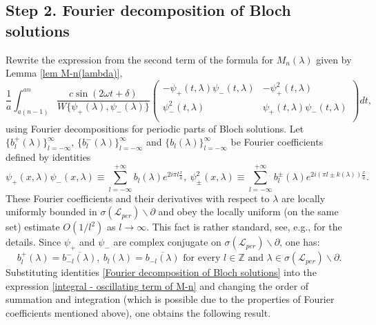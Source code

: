 \documentclass[a4paper,oneside,12pt]{amsart}
\begin{document}
\subsection*{Step 2. Fourier decomposition of Bloch solutions}
Rewrite the expression from the second term of the formula for $M_n(\lambda)$ given by Lemma \ref{lem M-n(lambda)},
\begin{equation}\label{integral - oscillating term of M-n}
    \frac1a\int_{a(n-1)}^{an}
    \frac{c\sin(2\omega t+\delta)}{W\{\psi_+(\lambda),\psi_-(\lambda)\}}
    \left(    \begin{array}{cc}
    -\psi_+(t,\lambda)\psi_-(t,\lambda) & -\psi_+^2(t,\lambda) \\
    \psi_-^2(t,\lambda) & \psi_+(t,\lambda)\psi_-(t,\lambda) \\
    \end{array}    \right)dt,
\end{equation}
using Fourier decompositions for periodic parts of Bloch solutions. Let $\{b_l^+(\lambda)\}_{l=-\infty}^{\infty}$, $\{b_l^-(\lambda)\}_{l=-\infty}^{\infty}$ and $\{b_l(\lambda)\}_{l=-\infty}^{\infty}$ be Fourier coefficients defined by identities
\begin{equation}\label{Fourier decomposition of Bloch solutions}
    \psi_+(x,\lambda)\psi_-(x,\lambda)\equiv\sum\limits_{l=-\infty}^{+\infty}b_l(\lambda)e^{2i\pi l\frac xa},
    \
    \psi_{\pm}^2(x,\lambda)\equiv\sum\limits_{l=-\infty}^{+\infty}b^{\pm}_l(\lambda)e^{2i(\pi l\pm k(\lambda))\frac xa}.
\end{equation}
These Fourier coefficients and their derivatives with respect to $\lambda$ are locally uniformly bounded in $\sigma(\mathcal
L_{per})\backslash\partial$ and obey the locally uniform (on the same set) estimate $O(1/l^2)$ as $l\rightarrow\infty$. This fact is rather standard, see, e.g., \cite{Kurasov-Simonov-2011} for the details. Since $\psi_+$ and $\psi_-$ are complex conjugate on $\sigma(\mathcal
L_{per})\backslash\partial$, one has:
\begin{equation*}
    b^+_l(\lambda)=\overline{b^-_{-l}(\lambda)},
    \
    b_l(\lambda)=\overline{b_{-l}(\lambda)}\text{ for every }l\in\mathbb Z\text{ and }\lambda\in\sigma(\mathcal
    L_{per})\backslash\partial.
\end{equation*}
Substituting identities \eqref{Fourier decomposition of Bloch solutions} into the expression \eqref{integral - oscillating term of M-n} and changing the order of summation and integration (which is possible due to the properties of Fourier coefficients mentioned above), one obtains the following result.
\end{document}
